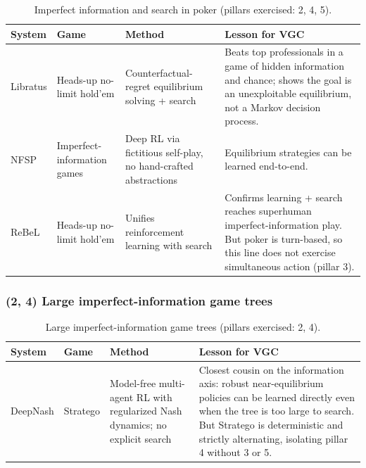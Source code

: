 \begin{table}[H]
\small
\tablespacing
\begin{tabularx}{\textwidth}{@{}>{\hsize=0.55\hsize\raggedright\arraybackslash}X
                                >{\hsize=0.55\hsize\raggedright\arraybackslash}X
                                >{\hsize=1.10\hsize\raggedright\arraybackslash}X
                                >{\hsize=1.80\hsize\raggedright\arraybackslash}X@{}}
\toprule
\textbf{System} & \textbf{Game} & \textbf{Method} & \textbf{Lesson for VGC} \\
\midrule
Libratus \cite{brown2017libratus}
  & Heads-up no-limit hold'em
  & Counterfactual-regret equilibrium solving + search
  & Beats top professionals in a game of hidden information and chance; shows the
    goal is an unexploitable equilibrium, not a Markov decision process. \\
\addlinespace
NFSP \cite{heinrich2016nfsp}
  & Imperfect-information games
  & Deep RL via fictitious self-play, no hand-crafted abstractions
  & Equilibrium strategies can be learned end-to-end. \\
\addlinespace
ReBeL \cite{brown2020rebel}
  & Heads-up no-limit hold'em
  & Unifies reinforcement learning with search
  & Confirms learning + search reaches superhuman imperfect-information play. But
    poker is turn-based, so this line does not exercise simultaneous action
    (pillar 3). \\
\bottomrule
\end{tabularx}
\caption{Imperfect information and search in poker (pillars exercised: 2, 4, 5).}
\label{tab:analog_poker}
\end{table}

\subsubsection{(2, 4) Large imperfect-information game trees}
\label{subsubsec:analog_stratego}

\begin{table}[H]
\small
\tablespacing
\begin{tabularx}{\textwidth}{@{}>{\hsize=0.55\hsize\raggedright\arraybackslash}X
                                >{\hsize=0.55\hsize\raggedright\arraybackslash}X
                                >{\hsize=1.10\hsize\raggedright\arraybackslash}X
                                >{\hsize=1.80\hsize\raggedright\arraybackslash}X@{}}
\toprule
\textbf{System} & \textbf{Game} & \textbf{Method} & \textbf{Lesson for VGC} \\
\midrule
DeepNash \cite{perolat2022deepnash}
  & Stratego
  & Model-free multi-agent RL with regularized Nash dynamics; no explicit search
  & Closest cousin on the information axis: robust near-equilibrium policies can be
    learned directly even when the tree is too large to search. But Stratego is
    deterministic and strictly alternating, isolating pillar 4 without 3 or 5. \\
\bottomrule
\end{tabularx}
\caption{Large imperfect-information game trees (pillars exercised: 2, 4).}
\label{tab:analog_stratego}
\end{table}

